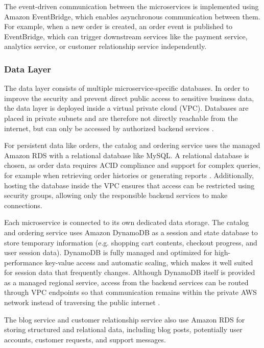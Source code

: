 \documentclass[12pt,a4paper]{article}
\begin{document}
The event-driven communication between the microservices is implemented using Amazon EventBridge, which enables asynchronous communication between them. For example, when a new order is created, an order event is published to EventBridge, which can trigger downstream services like the payment service, analytics service, or customer relationship service independently.

\subsubsection{Data Layer}

The data layer consists of multiple microservice-specific databases. In order to improve the security and prevent direct public access to sensitive business data, the data layer is deployed inside a virtual private cloud (VPC). Databases are placed in private subnets and are therefore not directly reachable from the internet, but can only be accessed by authorized backend services \cite{aws_vpc}.

For persistent data like orders, the catalog and ordering service uses the managed Amazon RDS with a relational database like MySQL. A relational database is chosen, as order data requires ACID compliance and support for complex queries, for example when retrieving order histories or generating reports \cite{microsoft_rds}. Additionally, hosting the database inside the VPC ensures that access can be restricted using security groups, allowing only the responsible backend services to make connections.

Each microservice is connected to its own dedicated data storage. The catalog and ordering service uses Amazon DynamoDB as a session and state database to store temporary information (e.g. shopping cart contents, checkout progress, and user session data). DynamoDB is fully managed and optimized for high-performance key-value access and automatic scaling, which makes it well suited for session data that frequently changes. Although DynamoDB itself is provided as a managed regional service, access from the backend services can be routed through VPC endpoints so that communication remains within the private AWS network instead of traversing the public internet \cite{aws_vpc}\cite{aws_vpc_dynamodb}.

The blog service and customer relationship service also use Amazon RDS for storing structured and relational data, including blog posts, potentially user accounts, customer requests, and support messages.
\end{document}
